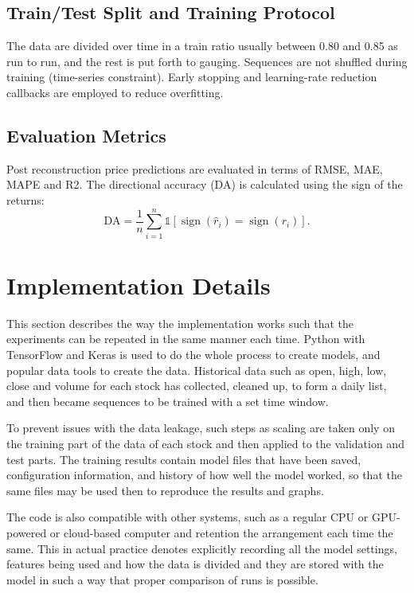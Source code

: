 \documentclass[conference]{IEEEtran}
\begin{document}
\subsection{Train/Test Split and Training Protocol}

The data are divided over time in a train ratio usually between 0.80 and 0.85 as run to run, and the rest is put forth to gauging. Sequences are not shuffled during training (time-series constraint). Early stopping and learning-rate reduction callbacks are employed to reduce overfitting.

\subsection{Evaluation Metrics}

Post reconstruction price predictions are evaluated in terms of RMSE, MAE, MAPE and R2. The directional accuracy (DA) is calculated using the sign of the returns:
\begin{equation}
 \text{DA} = \frac{1}{n}\sum_{i=1}^{n}\mathbb{1}[\operatorname{sign}(\hat{r}_i)=\operatorname{sign}(r_i)].
\end{equation}

\section{Implementation Details}

This section describes the way the implementation works such that the experiments can be repeated in the same manner each time. Python with TensorFlow and Keras is used to do the whole process to create models, and popular data tools to create the data. Historical data such as open, high, low, close and volume for each stock has collected, cleaned up, to form a daily list, and then became sequences to be trained with a set time window.

To prevent issues with the data leakage, such steps as scaling are taken only on the training part of the data of each stock and then applied to the validation and test parts. The training results contain model files that have been saved, configuration information, and history of how well the model worked, so that the same files may be used then to reproduce the results and graphs.

The code is also compatible with other systems, such as a regular CPU or GPU-powered or cloud-based computer and retention the arrangement each time the same. This in actual practice denotes explicitly recording all the model settings, features being used and how the data is divided and they are stored with the model in such a way that proper comparison of runs is possible.
\end{document}
